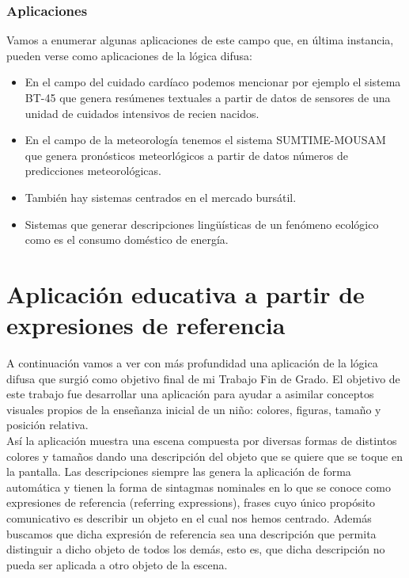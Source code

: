 \documentclass[10pt,a4paper]{article}
\begin{document}
\subsubsection{Aplicaciones}

Vamos a enumerar algunas aplicaciones de este campo que, en última instancia, pueden verse como aplicaciones de la lógica difusa:

\begin{itemize}
\item En el campo del cuidado cardíaco podemos mencionar por ejemplo el sistema BT-45 que genera resúmenes textuales a partir de datos de sensores de una unidad de cuidados intensivos de recien nacidos.
\item En el campo de la meteorología tenemos el sistema SUMTIME-MOUSAM que genera pronósticos meteorlógicos a partir de datos números de predicciones meteorológicas.
\item También hay sistemas centrados en el mercado bursátil.
\item Sistemas que generar descripciones lingüísticas de un fenómeno ecológico como es el consumo doméstico de energía.
\end{itemize}

\section{Aplicación educativa a partir de expresiones de referencia}

A continuación vamos a ver con más profundidad una aplicación de la lógica difusa que surgió como objetivo final de mi Trabajo Fin de Grado. El objetivo de este trabajo fue desarrollar una aplicación para ayudar a asimilar conceptos visuales propios de la enseñanza inicial de un niño: colores, figuras, tamaño y posición relativa.\\

Así la aplicación muestra una escena compuesta por diversas formas de distintos colores y tamaños dando una descripción del objeto que se quiere que se toque en la pantalla. Las descripciones siempre las genera la aplicación de forma automática y tienen la forma de sintagmas nominales en lo que se conoce como expresiones de referencia (referring expressions), frases cuyo único propósito comunicativo es describir un objeto en el cual nos hemos centrado. Además buscamos que dicha expresión de referencia sea una descripción que permita distinguir a dicho objeto de todos los demás, esto es, que dicha descripción no pueda ser aplicada a otro objeto de la escena.\\
\end{document}
